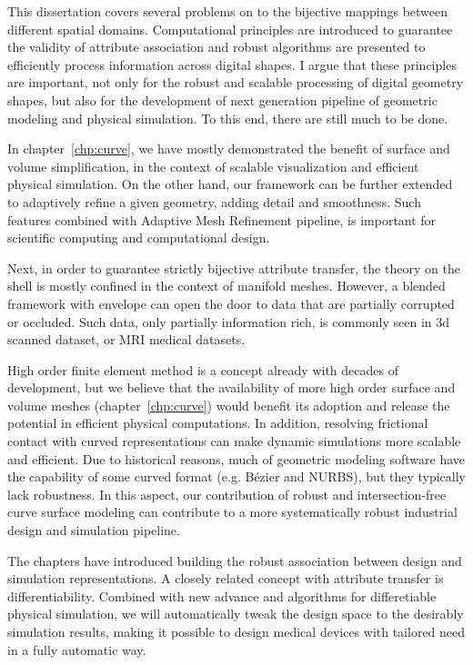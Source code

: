 This dissertation covers several problems on to the bijective mappings between different spatial domains. Computational principles are introduced to guarantee the validity of attribute association and robust algorithms are presented to efficiently process information across digital shapes. I argue that these principles are important, not only for the robust and scalable processing of digital geometry shapes, but also for the development of next generation pipeline of geometric modeling and physical simulation. To this end, there are still much to be done.


In chapter~\ref{chp:curve}, we have mostly demonstrated the benefit of surface and volume simplification, in the context of scalable visualization and efficient physical simulation. On the other hand, our framework can be further extended to adaptively refine a given geometry, adding detail and smoothness. Such features combined with Adaptive Mesh Refinement pipeline, is important for scientific computing and computational design.

Next, in order to guarantee strictly bijective attribute transfer, the theory on the shell is mostly confined in the context of manifold meshes. However, a blended framework with envelope \cite{hu2018tetrahedral, Wang:2021} can open the door to  data that are partially corrupted or occluded. Such data, only partially information rich, is commonly seen in 3d scanned dataset, or MRI medical datasets.

High order finite element method is a concept already with decades of development, but we believe that the availability of more high order surface and volume meshes (chapter~\ref{chp:curve}) would benefit its adoption and release the potential in efficient physical computations. In addition, resolving frictional contact with curved representations \cite{ferguson2022high} can make dynamic simulations more scalable and efficient. 
Due to historical reasons, much of geometric modeling software have the capability of some curved format (e.g. B{\'e}zier and NURBS), but they typically lack robustness. In this aspect, our contribution of robust and intersection-free curve surface modeling can contribute to a more systematically robust industrial design and simulation pipeline.

The chapters have introduced building the robust association between design and simulation representations. A closely related concept with attribute transfer is differentiability. Combined with new advance and algorithms for differetiable physical simulation, we will automatically tweak the design space to the desirably simulation results, making it possible to design medical devices with tailored need in a fully automatic way.

